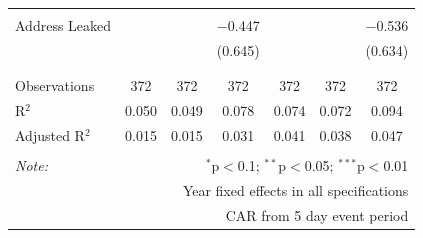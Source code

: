 \documentclass[../Main.tex]{subfiles}
\begin{document}
\begin{table}[!htbp]
{\begin{tabular}{@{\extracolsep{5pt}}lcccccc}
  & & & & & & \\ 
 Address Leaked &  &  & $-$0.447 &  &  & $-$0.536 \\ 
  &  &  & (0.645) &  &  & (0.634) \\ 
  & & & & & & \\ 
\hline \\[-1.8ex] 
Observations & 372 & 372 & 372 & 372 & 372 & 372 \\ 
R$^{2}$ & 0.050 & 0.049 & 0.078 & 0.074 & 0.072 & 0.094 \\ 
Adjusted R$^{2}$ & 0.015 & 0.015 & 0.031 & 0.041 & 0.038 & 0.047 \\ 
\hline 
\hline \\[-1.8ex] 
\textit{Note:}  & \multicolumn{6}{r}{$^{*}$p$<$0.1; $^{**}$p$<$0.05; $^{***}$p$<$0.01} \\ 
 & \multicolumn{6}{r}{Year fixed effects in all specifications} \\ 
 & \multicolumn{6}{r}{CAR from 5 day event period} \\ 
\end{tabular}} 
\end{table} 

\FloatBarrier

\biblio %
\end{document}
